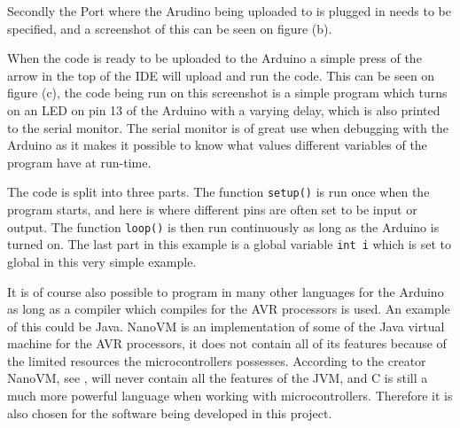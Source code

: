Secondly the Port where the Arudino being uploaded to is plugged in needs to be specified, and a screenshot of this can be seen on figure  (b).

When the code is ready to be uploaded to the Arduino a simple press of the arrow in the top of the IDE will upload and run the code. 
This can be seen on figure  (c), the code being run on this screenshot is a simple program which turns on an LED on pin 13 of the Arduino with a varying delay, which is also printed to the serial monitor.
The serial monitor is of great use when debugging with the Arduino as it makes it possible to know what values different variables of the program have at run-time.

The code is split into three parts.
The function \texttt{setup()} is run once when the program starts, and here is where different pins are often set to be input or output.
The function \texttt{loop()} is then run continuously as long as the Arduino is turned on. 
The last part in this example is a global variable \texttt{int i} which is set to global in this very simple example.

It is of course also possible to program in many other languages for the Arduino as long as a compiler which compiles for the AVR processors is used.
An example of this could be Java.
NanoVM is an implementation of some of the Java virtual machine for the AVR processors, it does not contain all of its features because of the limited resources the microcontrollers possesses. 
According to the creator NanoVM, see \cite{NanoVM}, will never contain all the features of the JVM, and C is still a much more powerful language when working with microcontrollers. 
Therefore it is also chosen for the software being developed in this project.
